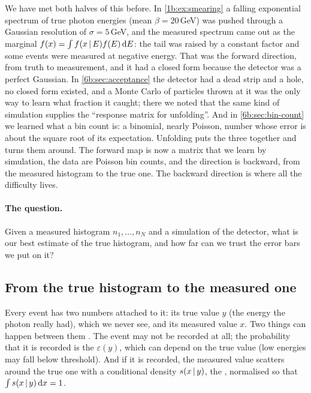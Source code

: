 We have met both halves of this before. In \cref{1b:ex:smearing} a falling exponential
spectrum of true photon energies (mean $\beta=20\,$GeV) was pushed through a Gaussian
resolution of $\sigma=5\,$GeV, and the measured spectrum came out as the marginal
$f(x)=\int f(x\,\vert\, E)f(E)\,\mathrm{d} E$: the tail was raised by a constant factor and some events
were measured at negative energy. That was the forward direction, from truth to measurement,
and it had a closed form because the detector was a perfect Gaussian. In
\cref{6b:sec:acceptance} the detector had a dead strip and a hole, no closed form existed, and
a Monte Carlo of particles thrown at it was the only way to learn what fraction it caught;
there we noted that the same kind of simulation supplies the ``response matrix for
unfolding''. And in \cref{6b:sec:bin-count} we learned what a bin count is: a binomial,
nearly Poisson, number whose error is about the square root of its expectation. Unfolding
puts the three together and turns them around. The forward map is now a matrix that we
learn by simulation, the data are Poisson bin counts, and the direction is backward, from
the measured histogram to the true one. The backward direction is where all the difficulty
lives.

\paragraph{The question.} Given a measured histogram $n_1,\dots,n_N$ and a simulation of the
detector, what is our best estimate of the true histogram, and how far can we trust the
error bars we put on it?

\subsection{From the true histogram to the measured one}
\label{6b:sec:unf-forward}

Every event has two numbers attached to it: its true value $y$ (the energy the photon really
had), which we never see, and its measured value $x$. Two things can happen between them
. The event may not be recorded at all; the probability that it is
recorded is the  $\varepsilon(y)$, which can depend on the true value (low
energies may fall below threshold). And if it is recorded, the measured value scatters around
the true one with a conditional density $s(x\,\vert\, y)$, the 
, normalised so that $\int s(x\,\vert\, y)\,\mathrm{d} x=1$.

